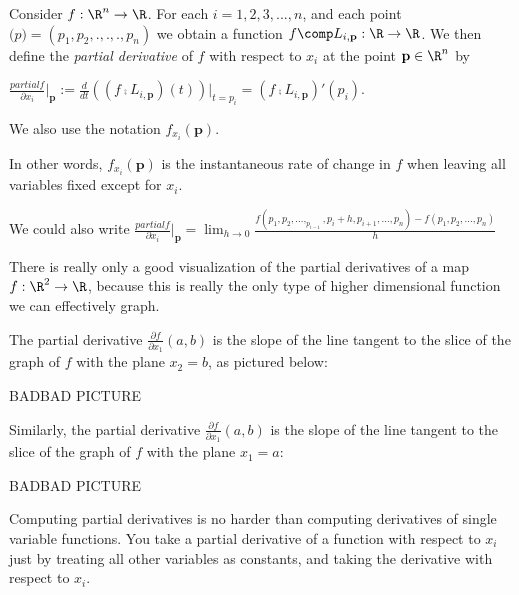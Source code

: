 \documentclass{ximera}
\begin{document}
\begin{definition}
	Consider $f:\R^n \to \R$.   For each $i = 1,2,3, ..., n$,  and each point $\mathbf(p) = (p_1,p_2,.,.,.,p_n)$ we obtain a function $f \comp L_{i,\mathbf{p}} : \R \to \R$.
	 We then define the \textit{partial derivative} of $f$ with respect to $x_i$ at the point $\mathbf{p} \in \R^n$ by
	
	$ \frac{partial f}{\partial x_i}\big|_{\mathbf{p}}:=  \frac{d}{dt} \left( (f \comp L_{i,\mathbf{p}})(t) \right)\big|_{t = p_i} = (f \comp L_{i,\mathbf{p}})'(p_i)$.
	
	We also use the notation  $f_{x_i}(\mathbf{p})$.
	
	In other words, $f_{x_i}(\mathbf{p})$ is the instantaneous rate of change in $f$ when leaving all variables fixed except for $x_i$.

	We could also write  $\frac{partial f}{\partial x_i}\big|_{\mathbf{p}} = \lim_{h \to 0} \frac{f(p_1,p_2,...,_p_{i-1},p_i+h,p_{i+1},...,p_n) - f(p_1,p_2,...,p_n)}{h}$

\end{definition}
	
	\begin{example}
		There is really only a good visualization of the partial derivatives of a map  $f: \R^2 \to \R$, 
		because this is really the only type of higher dimensional function we can effectively graph.
		
		The partial derivative $\frac{\partial f}{\partial x_1} \left(a,b\right)$ is the slope of the line tangent to the slice of the graph of $f$ with the
		plane $x_2 = b$, as pictured below:
		
		BADBAD PICTURE
		
		Similarly, the partial derivative  $\frac{\partial f}{\partial x_1} \left(a,b\right)$ is the slope of the line tangent to the slice of the graph of $f$ with the
		plane $x_1=a$:
		
		BADBAD PICTURE
		
	\end{example}
	
	Computing partial derivatives is no harder than computing derivatives of single variable functions.  You take a 
	 partial derivative of a function with respect to $x_i$ just by treating all other variables as constants, and taking the derivative with respect to $x_i$.
	
\end{document}
